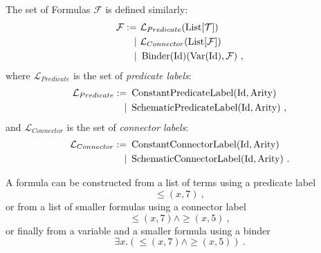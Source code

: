 \begin{defin}[Formulas]
  The set of Formulas $\mathcal{F}$ is defined similarly:
  \begin{align}
    \mathcal{F} := & ~\mathcal{L}_{Predicate}(\operatorname{List}[\mathcal{T}])                                  \\
    \mid           & ~\mathcal{L}_{Connector}(\operatorname{List}[\mathcal{F}])                                  \\
    \mid           & ~\operatorname{Binder}(\textnormal{Id})(\operatorname{Var}(\textnormal{Id}), \mathcal{F})~,
  \end{align}
  where $\mathcal{L}_{Predicate}$ is the set of \textit{predicate labels}:
  \begin{align}
    \mathcal{L}_{Predicate} := & ~\operatorname{ConstantPredicateLabel}(\textnormal{Id}, \textnormal{Arity})    \\
    \mid                       & ~\operatorname{SchematicPredicateLabel}(\textnormal{Id}, \textnormal{Arity})~,
  \end{align}
  and $\mathcal{L}_{Connector}$ is the set of \textit{connector labels}:
  \begin{align}
    \mathcal{L}_{Connector} := & ~\operatorname{ConstantConnectorLabel}(\textnormal{Id}, \textnormal{Arity})    \\
    \mid                       & ~\operatorname{SchematicConnectorLabel}(\textnormal{Id}, \textnormal{Arity})~.
  \end{align}

  A formula can be constructed from a list of terms using a predicate label
  $$
    {\leq}(x, 7)~,
  $$
  or from a list of smaller formulas using a connector label
  $$
    {\leq}(x, 7) \land {\geq}(x, 5)~,
  $$
  or finally from a variable and a smaller formula using a binder
  $$
    \exists x. \left({\leq}(x, 7) \land {\geq}(x, 5)\right)~.
  $$


\end{defin}
